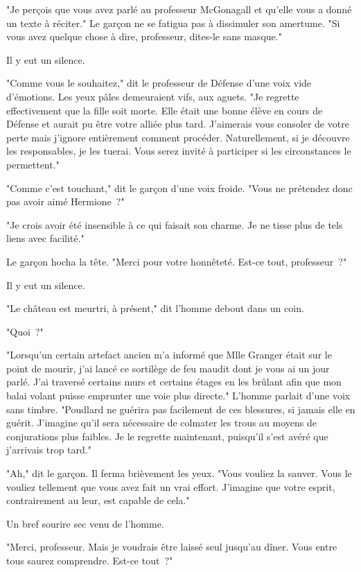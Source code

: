 "Je perçois que vous avez parlé au professeur McGonagall et qu'elle vous a donné un texte à réciter." Le garçon ne se fatigua pas à dissimuler son amertume. "Si vous avez quelque chose à dire, professeur, dites-le sans masque."

Il y eut un silence.

"Comme vous le souhaitez," dit le professeur de Défense d'une voix vide d'émotions. Les yeux pâles demeuraient vifs, aux aguets. "Je regrette effectivement que la fille soit morte. Elle était une bonne élève en cours de Défense et aurait pu être votre alliée plus tard. J'aimerais vous consoler de votre perte mais j'ignore entièrement comment procéder. Naturellement, si je découvre les responsables, je les tuerai. Vous serez invité à participer si les circonstances le permettent."

"Comme c'est touchant," dit le garçon d'une voix froide. "Vous ne prétendez donc pas avoir aimé Hermione~?"

"Je crois avoir été insensible à ce qui faisait son charme. Je ne tisse plus de tels liens avec facilité."

Le garçon hocha la tête. "Merci pour votre honnêteté. Est-ce tout, professeur~?"

Il y eut un silence.

"Le château est meurtri, à présent," dit l'homme debout dans un coin.

"Quoi~?"

"Lorsqu'un certain artefact ancien m'a informé que Mlle Granger était sur le point de mourir, j'ai lancé ce sortilège de feu maudit dont je vous ai un jour parlé. J'ai traversé certains murs et certains étages en les brûlant afin que mon balai volant puisse emprunter une voie plus directe." L'homme parlait d'une voix sans timbre. "Poudlard ne guérira pas facilement de ces blessures, si jamais elle en guérit. J'imagine qu'il sera nécessaire de colmater les trous au moyens de conjurations plus faibles. Je le regrette maintenant, puisqu'il s'est avéré que j'arrivais trop tard."

"Ah," dit le garçon. Il ferma brièvement les yeux. "Vous vouliez la sauver. Vous le vouliez tellement que vous avez fait un vrai effort. J'imagine que votre esprit, contrairement au leur, est capable de cela."

Un bref sourire sec venu de l'homme.

"Merci, professeur. Mais je voudrais être laissé seul jusqu'au dîner. Vous entre tous saurez comprendre. Est-ce tout~?"

